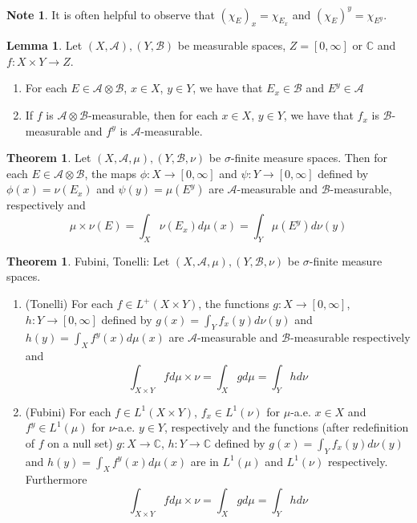\documentclass[12pt]{amsart}
\theoremstyle{definition}
\newtheorem{note}[definition]{Note}
\newtheorem{thm}[definition]{Theorem}
\newtheorem{lem}[definition]{Lemma}
\newcommand{\sig}{\sigma}
\newcommand{\C}{\mathbb{C}}
\newcommand{\MA}{\mathcal{A}}
\newcommand{\MB}{\mathcal{B}}
\newcommand{\RG}{[0,\infty]}
\begin{document}
	\begin{note}
		It is often helpful to observe that $(\chi_E)_x = \chi_{E_x}$ and $(\chi_E)^y = \chi_{E^y}$.
	\end{note}
	
	\begin{lem}
		Let $(X,\MA), (Y, \MB)$ be measurable spaces, $Z = \RG$ or $\C$ and $f:X\times Y \rightarrow Z$. 
		\begin{enumerate}
			\item For each $E \in \MA \otimes \MB$, $x \in X$, $y \in Y$, we have that $E_x \in \MB$ and $E^y \in \MA$
			\item If $f$ is  $\MA \otimes \MB$-measurable, then for each $x \in X$, $y \in Y$, we have that $f_x$ is $\MB$-measurable and $f^y$ is $\MA$-measurable.   
		\end{enumerate}
	\end{lem}
	
	\begin{thm}
		Let $(X,\MA, \mu), (Y, \MB, \nu)$ be $\sig$-finite measure spaces. Then for each $E \in \MA \otimes \MB$, the maps $\phi:X \rightarrow \RG$ and $\psi: Y \rightarrow \RG$ defined by $\phi(x) = \nu(E_x)$ and $\psi(y) = \mu(E^y)$ are $\MA$-measurable and $\MB$-measurable, respectively and $$\mu \times \nu(E) = \int_X \nu(E_x)d\mu(x) = \int_Y \mu(E^y)d\nu(y)$$ 
	\end{thm}
	
	\begin{thm}{Fubini, Tonelli:}
		Let $(X,\MA, \mu), (Y, \MB, \nu)$ be $\sig$-finite measure spaces. 
		
		\begin{enumerate}
			\item (Tonelli) For each $f \in L^+(X \times Y)$, the functions $g:X \rightarrow \RG$, $h:Y \rightarrow \RG$ defined by $g(x) = \int_Y f_x(y)d\nu(y)$ and $h(y) = \int_X f^y(x) d \mu(x)$ are $\MA$-measurable and $\MB$-measurable respectively and $$\int_{X \times Y}f d \mu \times \nu = \int_X g d\mu = \int_Y h d\nu$$
			
			\item (Fubini) For each $f \in L^1(X \times Y)$, $f_x \in L^1(\nu)$ for $\mu$-a.e. $x \in X$ and $f^y \in L^1(\mu)$ for $\nu$-a.e. $y \in Y$, respectively and  the functions (after redefinition of $f$ on a null set) $g:X \rightarrow \C$, $h:Y \rightarrow \C$ defined by $g(x) = \int_Y f_x(y)d\nu(y)$ and $h(y) = \int_X f^y(x) d \mu(x)$ are in $L^1(\mu)$ and $L^1(\nu)$ respectively. Furthermore 
			$$\int_{X \times Y}f d \mu \times \nu = \int_X g d\mu = \int_Y h d\nu$$
		\end{enumerate}
	\end{thm}
	
\end{document}
